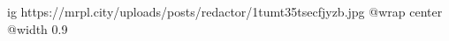  
 
 
 
 

\ifcmt
  ig https://mrpl.city/uploads/posts/redactor/1tumt35tsecfjyzb.jpg
  @wrap center
  @width 0.9
\fi
